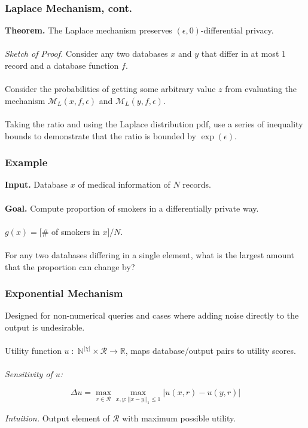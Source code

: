 \documentclass[aspectratio=169]{beamer}
\newcommand{\emm}{\mathcal{M}}
\newcommand{\dbd}{\mathbb{N}^{|\chi|}}
\begin{document}
\begin{frame}
\frametitle{Laplace Mechanism, cont.}

\textbf{Theorem.} The Laplace mechanism preserves $(\epsilon, 0)$-differential privacy.\\~\\

\emph{Sketch of Proof.} Consider any two databases $x$ and $y$ that differ in at most $1$ record and a database function $f$. \\~\\

Consider the probabilities of getting some arbitrary value $z$ from evaluating the mechanism $\emm_L(x, f, \epsilon)$ and $\emm_L(y, f, \epsilon)$.\\~\\

Taking the ratio and using the Laplace distribution pdf, use a series of inequality bounds to demonstrate that the ratio is bounded by $\exp(\epsilon)$.

\end{frame}

\begin{frame}
\frametitle{Example}

\textbf{Input.} Database $x$ of medical information of $N$ records.\\~\\

\textbf{Goal.} Compute proportion of smokers in a differentially private way.\\~\\

$g(x) = [\#$ of smokers in $x]/N$.\\~\\

For any two databases differing in a single element, what is the largest amount that the proportion can change by?
\end{frame}

\begin{frame}
\frametitle{Exponential Mechanism}

Designed for non-numerical queries and cases where adding noise directly to the output is undesirable.\\~\\

Utility function $u\;:\; \dbd \times \mathcal{R} \rightarrow \mathbb{R}$, maps database/output pairs to utility scores.\\~\\

\emph{Sensitivity of $u$:}

$$\Delta u = \max_{r \in \mathcal{R}} \max_{x,y:||x-y||_1 \leq 1} |u(x,r) - u(y,r)|$$

\emph{Intuition.} Output element of $\mathcal{R}$ with maximum possible utility.\\~\\
\end{frame}
\end{document}

